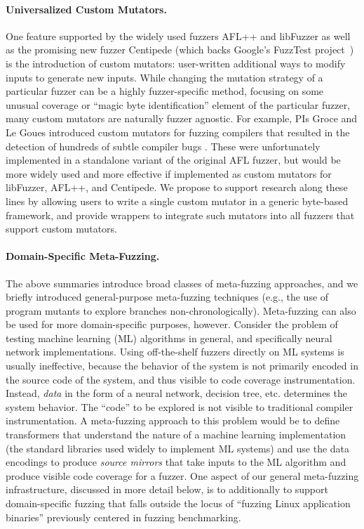 \paragraph{Universalized Custom Mutators.}  One feature supported by
the widely used fuzzers AFL++ and libFuzzer as well as the promising
new fuzzer Centipede (which backs Google's FuzzTest
project~\cite{fuzztest}) is the introduction of custom mutators:  user-written 
additional ways to modify inputs to generate new inputs.  While changing the 
mutation strategy of a particular fuzzer can be a highly fuzzer-specific 
method, focusing on some unusual coverage or ``magic byte identification'' 
element of the particular fuzzer, many custom mutators are naturally fuzzer 
agnostic.  For example, PIs Groce and Le Goues introduced custom mutators for 
fuzzing compilers that resulted in the detection of hundreds of subtle compiler 
bugs \cite{cc2022}. These were unfortunately implemented in a standalone variant of the 
original AFL fuzzer, but would be more widely used and more effective if 
implemented as custom mutators for libFuzzer, AFL++, and Centipede.  We propose to support 
research along these lines by allowing users to write a single custom mutator 
in a generic byte-based framework, and provide wrappers to integrate such 
mutators into all fuzzers that support custom mutators.

\paragraph{Domain-Specific Meta-Fuzzing.} The above summaries introduce 
broad classes of meta-fuzzing approaches, and we briefly introduced  
general-purpose meta-fuzzing techniques (e.g., the use of program mutants to 
explore branches non-chronologically).  Meta-fuzzing can also be used for more 
domain-specific purposes, however.  Consider the problem of testing machine 
learning (ML) algorithms in general, and specifically neural network 
implementations.  Using off-the-shelf fuzzers directly on ML systems is usually 
ineffective, because the behavior of the system is not primarily encoded in the 
source code of the system, and thus visible to code coverage instrumentation.  
Instead, \emph{data} in the form of a neural network, decision tree, etc. 
determines the system behavior.  The ``code'' to be explored is not visible to 
traditional compiler instrumentation.  A meta-fuzzing approach to this problem 
would be to define transformers that understand the nature of a machine 
learning implementation (the standard libraries used widely to implement ML 
systems) and use the data encodings to produce \emph{source mirrors} that take 
inputs to the ML algorithm and produce visible code coverage for a fuzzer.  One 
aspect of our general meta-fuzzing infrastructure, discussed in more detail 
below, is to additionally to support domain-specific fuzzing that falls outside 
the locus of ``fuzzing Linux application binaries'' previously centered in 
fuzzing benchmarking.


